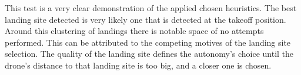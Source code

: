     This test is a very clear demonstration of the applied chosen heuristics. The best landing site detected is very likely one that is detected at the takeoff position. Around this clustering of landings there is notable space of no attempts performed. This can be attributed to the competing motives of the landing site selection. The quality of the landing site defines the autonomy's choice until the drone's distance to that landing site is too big, and a closer one is chosen. 

